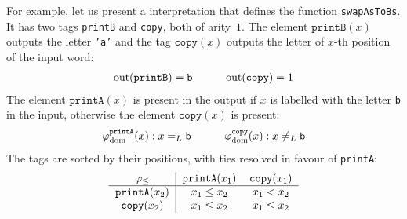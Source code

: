 For example, let us present a  interpretation that defines the function \texttt{swapAsToBs}. 
It has two tags \texttt{printB} and \texttt{copy}, both of arity~$1$. 
The element $\mathtt{printB}(x)$ outputs the letter \texttt{'a'} and the tag $\mathtt{copy}(x)$
outputs the letter of $x$-th position of the input word:
\[
\begin{tabular}{ccc}
    $\text{out}(\mathtt{printB}) = \mathtt{b}$ & \ \ \ & $\text{out}(\mathtt{copy}) = 1$ \\
\end{tabular}
\]
The element $\mathtt{printA}(x)$ is present in the output if $x$ is labelled with the letter \texttt{b}
in the input, otherwise the element $\mathtt{copy}(x)$ is present:
\[
\begin{tabular}{ccc}
    $\varphi_{\text{dom}}^{\mathtt{printA}}(x) : x =_L \mathtt{b}$ & \ \ \  &$\varphi_{\text{dom}}^{\mathtt{copy}}(x) : x \neq_L \mathtt{b}$ \\
\end{tabular}
\]
The tags are sorted by their positions, with ties resolved in favour of \texttt{printA}:
\[ 
\begin{tabular}{c|cc}
    $\varphi_{\leq}$ & $\mathtt{printA}(x_1)$ & $\mathtt{copy}(x_1)$ \\
    \hline
    $\mathtt{printA}(x_2)$ & $x_1 \leq x_2$ & $x_1 < x_2$ \\
    $\mathtt{copy}(x_2)$ & $x_1 \leq x_2$ & $x_1 \leq x_2$ \\
\end{tabular}
\]